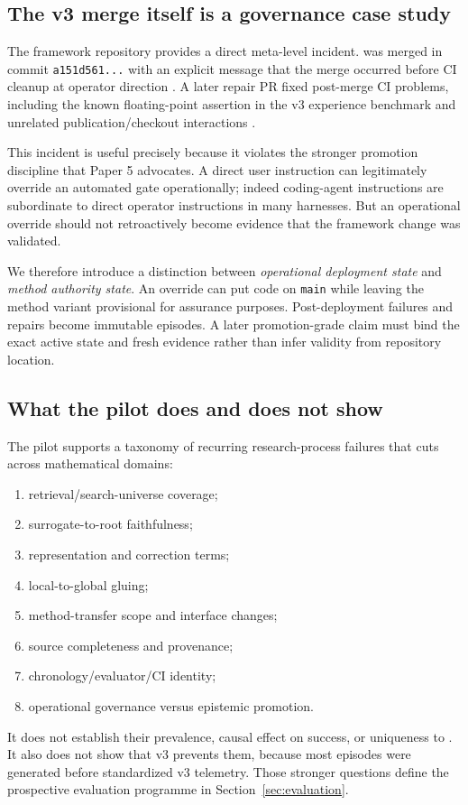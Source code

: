 \subsection{The v3 merge itself is a governance case study}

The framework repository provides a direct meta-level incident. \RAKL{} was merged in commit \texttt{a151d561...} with an explicit message that the merge occurred before CI cleanup at operator direction \cite{rakl_v3_merge}. A later repair PR fixed post-merge CI problems, including the known floating-point assertion in the v3 experience benchmark and unrelated publication/checkout interactions \cite{rakl_pr120}.

This incident is useful precisely because it violates the stronger promotion discipline that Paper 5 advocates. A direct user instruction can legitimately override an automated gate operationally; indeed coding-agent instructions are subordinate to direct operator instructions in many harnesses. But an operational override should not retroactively become evidence that the framework change was validated.

We therefore introduce a distinction between \emph{operational deployment state} and \emph{method authority state}. An override can put code on \texttt{main} while leaving the method variant provisional for assurance purposes. Post-deployment failures and repairs become immutable episodes. A later promotion-grade claim must bind the exact active state and fresh evidence rather than infer validity from repository location.

\subsection{What the pilot does and does not show}

The pilot supports a taxonomy of recurring research-process failures that cuts across mathematical domains:

\begin{enumerate}[leftmargin=*]
\item retrieval/search-universe coverage;
\item surrogate-to-root faithfulness;
\item representation and correction terms;
\item local-to-global gluing;
\item method-transfer scope and interface changes;
\item source completeness and provenance;
\item chronology/evaluator/CI identity;
\item operational governance versus epistemic promotion.
\end{enumerate}

It does not establish their prevalence, causal effect on success, or uniqueness to \RAKL{}. It also does not show that v3 prevents them, because most episodes were generated before standardized v3 telemetry. Those stronger questions define the prospective evaluation programme in Section~\ref{sec:evaluation}.